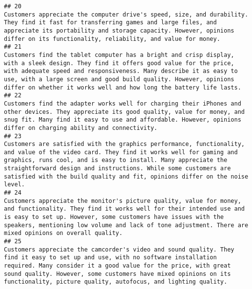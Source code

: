\documentclass[
]{article}
\begin{document}
\begin{verbatim}
## 20                                                                                                                                                                                                                 Customers appreciate the computer drive's speed, size, and durability. They find it fast for transferring games and large files, and appreciate its portability and storage capacity. However, opinions differ on its functionality, reliability, and value for money.
## 21                                                                                                                                      Customers find the tablet computer has a bright and crisp display, with a sleek design. They find it offers good value for the price, with adequate speed and responsiveness. Many describe it as easy to use, with a large screen and good build quality. However, opinions differ on whether it works well and how long the battery life lasts.
## 22                                                                                                                                                                                                                           Customers find the adapter works well for charging their iPhones and other devices. They appreciate its good quality, value for money, and snug fit. Many find it easy to use and affordable. However, opinions differ on charging ability and connectivity.
## 23                                                                                                                             Customers are satisfied with the graphics performance, functionality, and value of the video card. They find it works well for gaming and graphics, runs cool, and is easy to install. Many appreciate the straightforward design and instructions. While some customers are satisfied with the build quality and fit, opinions differ on the noise level.
## 24                                                                                                                                                                   Customers appreciate the monitor's picture quality, value for money, and functionality. They find it works well for their intended use and is easy to set up. However, some customers have issues with the speakers, mentioning low volume and lack of tone adjustment. There are mixed opinions on overall quality.
## 25                                                                                                                                                  Customers appreciate the camcorder's video and sound quality. They find it easy to set up and use, with no software installation required. Many consider it a good value for the price, with great sound quality. However, some customers have mixed opinions on its functionality, picture quality, autofocus, and lighting quality.

\end{verbatim}
\end{document}
